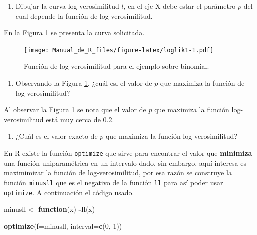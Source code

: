 \documentclass[10pt,]{krantz}
\makeatletter
\newenvironment{Shaded}{\begin{snugshade}}{\end{snugshade}}
\newcommand{\KeywordTok}[1]{\textcolor[rgb]{0.13,0.29,0.53}{\textbf{#1}}}
\newcommand{\DataTypeTok}[1]{\textcolor[rgb]{0.13,0.29,0.53}{#1}}
\newcommand{\DecValTok}[1]{\textcolor[rgb]{0.00,0.00,0.81}{#1}}
\newcommand{\StringTok}[1]{\textcolor[rgb]{0.31,0.60,0.02}{#1}}
\newcommand{\ControlFlowTok}[1]{\textcolor[rgb]{0.13,0.29,0.53}{\textbf{#1}}}
\newcommand{\OperatorTok}[1]{\textcolor[rgb]{0.81,0.36,0.00}{\textbf{#1}}}
\newcommand{\NormalTok}[1]{#1}
\providecommand{\tightlist}{%
  \setlength{\itemsep}{0pt}\setlength{\parskip}{0pt}}
\let\proglang=\textsf
\newenvironment{kframe}{%
\medskip{}
\setlength{\fboxsep}{.8em}
 \def\at@end@of@kframe{}%
 \ifinner\ifhmode%
  \def\at@end@of@kframe{\end{minipage}}%
  \begin{minipage}{\columnwidth}%
 \fi\fi%
 \def\FrameCommand##1{\hskip\@totalleftmargin \hskip-\fboxsep
 \colorbox{shadecolor}{##1}\hskip-\fboxsep
     \hskip-\linewidth \hskip-\@totalleftmargin \hskip\columnwidth}%
 \MakeFramed {\advance\hsize-\width
   \@totalleftmargin\z@ \linewidth\hsize
   \@setminipage}}%
 {\par\unskip\endMakeFramed%
 \at@end@of@kframe}
\renewenvironment{Shaded}{\begin{kframe}}{\end{kframe}}
\makeatother
\begin{document}
\begin{enumerate}
\def\labelenumi{\arabic{enumi})}
\setcounter{enumi}{2}
\tightlist
\item
  Dibujar la curva log-verosimilitud \(l\), en el eje X debe estar el
  parámetro \(p\) del cual depende la función de log-verosimilitud.
\end{enumerate}

En la Figura \ref{fig:loglik1} se presenta la curva solicitada.

\begin{figure}
\centering
\texttt{[image: Manual\_de\_R\_files/figure-latex/loglik1-1.pdf]}
\caption{\label{fig:loglik1}Función de log-verosimilitud para el ejemplo
sobre binomial.}
\end{figure}

\begin{enumerate}
\def\labelenumi{\arabic{enumi})}
\setcounter{enumi}{3}
\tightlist
\item
  Observando la Figura \ref{fig:loglik1}, ¿cuál esl el valor de \(p\)
  que maximiza la función de log-verosimilitud?
\end{enumerate}

Al observar la Figura \ref{fig:loglik1} se nota que el valor de \(p\)
que maximiza la función log-verosimilitud está muy cerca de 0.2.

\begin{enumerate}
\def\labelenumi{\arabic{enumi})}
\setcounter{enumi}{4}
\tightlist
\item
  ¿Cuál es el valor exacto de \(p\) que maximiza la función
  log-verosimilitud?
\end{enumerate}

En \proglang{R} existe la función \texttt{optimize} que sirve para
encontrar el valor que \textbf{minimiza} una función uniparamétrica en
un intervalo dado, sin embargo, aquí interesa es maximimizar la función
de log-verosimilitud, por esa razón se construye la función
\texttt{minusll} que es el negativo de la función \texttt{ll} para así
poder usar \texttt{optimize}. A continuación el código usado.

\begin{Shaded}
\begin{Highlighting}[]
\NormalTok{minusll <-}\StringTok{ }\ControlFlowTok{function}\NormalTok{(x) }\OperatorTok{-}\KeywordTok{ll}\NormalTok{(x)}

\KeywordTok{optimize}\NormalTok{(}\DataTypeTok{f=}\NormalTok{minusll, }\DataTypeTok{interval=}\KeywordTok{c}\NormalTok{(}\DecValTok{0}\NormalTok{, }\DecValTok{1}\NormalTok{))}
\end{Highlighting}
\end{Shaded}
\end{document}
